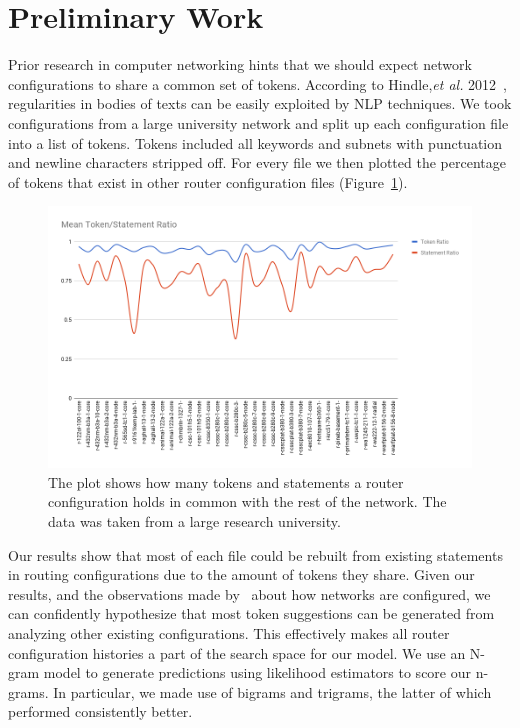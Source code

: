 \section{Preliminary Work}

Prior research in computer networking hints that we should expect network configurations to share a common set of tokens. According to Hindle,\textit{et al.} 2012~\cite{naturalness}, regularities in bodies of texts can be easily exploited by NLP techniques. We took configurations from a large university network and split up each configuration file into a list of tokens. Tokens included all keywords and subnets with punctuation and newline characters stripped off. For every file we then plotted the percentage of tokens that exist in other router 
configuration files (Figure~\ref{fig:chart}).

\begin{figure}
	\centering
	\includegraphics[width=\columnwidth]{chart.png}
	\caption{The plot shows how many tokens and statements a router configuration holds in common with the rest of the network. The data was taken from a large research university.}
    \label{fig:chart}
\end{figure}

Our results show that most of each file could be rebuilt from existing statements in routing configurations due to the amount of tokens they share. Given our results, and the observations made by~\cite{complexity} about how networks are configured, we can confidently hypothesize that most token suggestions can be generated from analyzing other existing configurations. This effectively makes all router configuration histories a part of the search space for our model. We use an N-gram model to generate predictions using likelihood estimators to score our n-grams. In particular, we made use of bigrams and trigrams, the latter of which performed consistently better.

